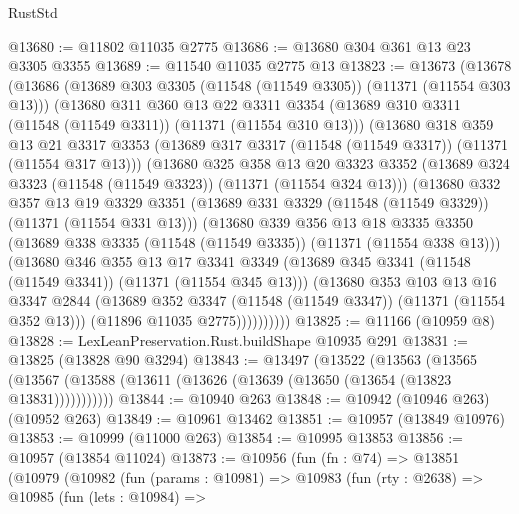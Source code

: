 \begin{lexlean}{RustStd}
\begin{coremodule}
@13680 := @11802 @11035 @2775
@13686 := @13680 @304 @361 @13 @23 @3305 @3355
@13689 := @11540 @11035 @2775 @13
@13823 := @13673
    (@13678
      (@13686
        (@13689 @303 @3305 (@11548 (@11549 @3305)) (@11371 (@11554 @303 @13)))
        (@13680
          @311
          @360
          @13
          @22
          @3311
          @3354
          (@13689 @310 @3311 (@11548 (@11549 @3311)) (@11371 (@11554 @310 @13)))
          (@13680
            @318
            @359
            @13
            @21
            @3317
            @3353
            (@13689 @317 @3317 (@11548 (@11549 @3317)) (@11371 (@11554 @317 @13)))
            (@13680
              @325
              @358
              @13
              @20
              @3323
              @3352
              (@13689 @324 @3323 (@11548 (@11549 @3323)) (@11371 (@11554 @324 @13)))
              (@13680
                @332
                @357
                @13
                @19
                @3329
                @3351
                (@13689 @331 @3329 (@11548 (@11549 @3329)) (@11371 (@11554 @331 @13)))
                (@13680
                  @339
                  @356
                  @13
                  @18
                  @3335
                  @3350
                  (@13689 @338 @3335 (@11548 (@11549 @3335)) (@11371 (@11554 @338 @13)))
                  (@13680
                    @346
                    @355
                    @13
                    @17
                    @3341
                    @3349
                    (@13689 @345 @3341 (@11548 (@11549 @3341)) (@11371 (@11554 @345 @13)))
                    (@13680
                      @353
                      @103
                      @13
                      @16
                      @3347
                      @2844
                      (@13689 @352 @3347 (@11548 (@11549 @3347)) (@11371 (@11554 @352 @13)))
                      (@11896 @11035 @2775))))))))))
@13825 := @11166 (@10959 @8)
@13828 := LexLeanPreservation.Rust.buildShape @10935 @291
@13831 := @13825 (@13828 @90 @3294)
@13843 := @13497
    (@13522
      (@13563
        (@13565 (@13567 (@13588 (@13611 (@13626 (@13639 (@13650 (@13654 (@13823 @13831)))))))))))
@13844 := @10940 @263
@13848 := @10942 (@10946 @263) (@10952 @263)
@13849 := @10961 @13462
@13851 := @10957 (@13849 @10976)
@13853 := @10999 (@11000 @263)
@13854 := @10995 @13853
@13856 := @10957 (@13854 @11024)
@13873 := @10956
    (fun (fn : @74) =>
    @13851
      (@10979
        (@10982
          (fun (params : @10981) =>
          @10983
            (fun (rty : @2638) =>
            @10985
              (fun (lets : @10984) =>

\end{coremodule}
\end{lexlean}
